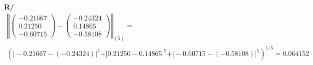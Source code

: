 \documentclass[12pt]{article}
\begin{document}
\begin{enumerate}[leftmargin=*,widest=9]
{\begin{enumerate}[label=\alph*]
   \textbf{R/}
   \begin{eqnarray*}
\left\Vert \begin{pmatrix}-0.21667\\0.21250\\-0.60715\end{pmatrix} - \begin{pmatrix} -0.24324 \\ 0.14865 \\ -0.58108 \end{pmatrix} \right\Vert_{(5)}= \\{\left(\vert -0.21667 - (-0.24324) \vert^5 + \vert 0.21250 - 0.14865 \vert^5 + \vert -0.60715 - (-0.58108) \vert^5\right)}^{1/5} = 0.064152
   \end{eqnarray*}
\end{enumerate}
}
   \end{enumerate}
\end{document}
